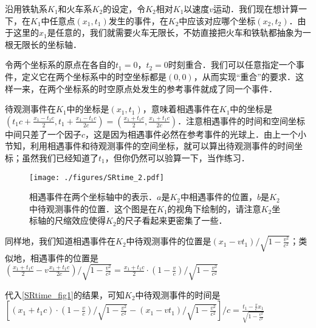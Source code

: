 沿用铁轨系$K_1$和火车系$K_2$的设定，令$K_2$相对$K_1$以速度$v$运动．我们现在想计算一下，在$K_1$中任意点$(x_1,t_1)$发生的事件，在$K_2$中应该对应哪个坐标$(x_2,t_2)$．由于这里的$x_1$是任意的，我们就需要火车无限长，不妨直接把火车和铁轨都抽象为一根无限长的坐标轴．

令两个坐标系的原点在各自的$t_1=0$，$t_2=0$时刻重合．我们可以任意指定一个事件，定义它在两个坐标系中的时空坐标都是$(0,0)$，从而实现“重合”的要求．这样一来，在两个坐标系的时空原点处发生的参考事件就成了同一个事件．

待观测事件在$K_1$中的坐标是$(x_1, t_1)$，意味着相遇事件在$K_1$中的坐标是$(t_1c+\frac{x_1-t_1c}{2}, t_1+\frac{x_1-t_1c}{2c})=(\frac{x_1+t_1c}{2},\frac{x_1+t_1c}{2c})$．注意相遇事件的时间和空间坐标中间只差了一个因子$c$，这是因为相遇事件必然在参考事件的光球上．由上一个小节知，利用相遇事件和待观测事件的空间坐标，就可以算出待观测事件的时间坐标；虽然我们已经知道了$t_1$，但你仍然可以验算一下，当作练习．

\begin{figure}[ht]
\centering
\texttt{[image: ./figures/SRtime\_2.pdf]}
\caption{相遇事件在两个坐标轴中的表示．$a$是$K_2$中相遇事件的位置，$b$是$K_2$中待观测事件的位置．这个图是在$K_1$的视角下绘制的，请注意$K_2$坐标轴的尺缩效应使得$K_2$的尺子看起来更密集了一些．} \label{SRtime_fig2}
\end{figure}

同样地，我们知道相遇事件在$K_2$中待观测事件的位置是$(x_1-vt_1)/\sqrt{1-\frac{v^2}{c^2}}$；类似地，相遇事件的位置是$(\frac{x_1+t_1c}{2}-v\frac{x_1+t_1c}{2c})/\sqrt{1-\frac{v^2}{c^2}}=\frac{x_1+t_1c}{2}\cdot(1-\frac{v}{c})/\sqrt{1-\frac{v^2}{c^2}}$

代入\autoref{SRtime_fig1}的结果，可知$K_2$中待观测事件的时间是$[(x_1+t_1c)\cdot(1-\frac{v}{c})/\sqrt{1-\frac{v^2}{c^2}}-(x_1-vt_1)/\sqrt{1-\frac{v^2}{c^2}}]/c=\frac{t_1-\frac{v}{c}x_1}{\sqrt{1-\frac{v^2}{c^2}}}$
